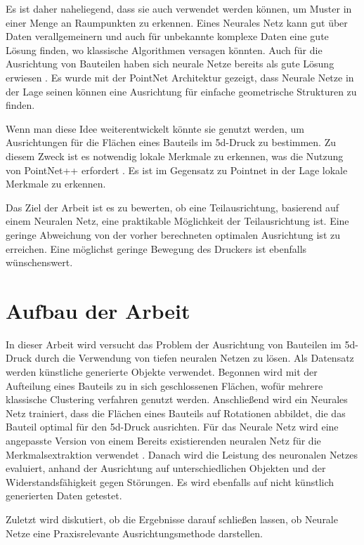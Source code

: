 \smallskip

Es ist daher naheliegend, dass sie auch verwendet werden können, um Muster in einer Menge an Raumpunkten zu erkennen. Eines Neurales Netz kann gut über Daten verallgemeinern und auch für unbekannte komplexe Daten eine gute Lösung finden, wo klassische Algorithmen versagen könnten.
Auch für die Ausrichtung von Bauteilen haben sich neurale Netze bereits als gute Lösung erwiesen \cite{Datensatz}. Es wurde mit der PointNet Architektur \cite{qi2017pointnet} gezeigt, 
dass Neurale Netze in der Lage seinen können eine Ausrichtung für einfache geometrische Strukturen zu finden. 

\smallskip

Wenn man diese Idee weiterentwickelt könnte sie genutzt werden, um Ausrichtungen für die Flächen eines Bauteils im 5d-Druck zu bestimmen.
Zu diesem Zweck ist es notwendig lokale Merkmale zu erkennen, was die Nutzung von PointNet++ erfordert \cite{PointNet++}. Es ist im Gegensatz zu Pointnet in der Lage lokale Merkmale zu erkennen.

\smallskip

Das Ziel der Arbeit ist es zu bewerten, ob eine Teilausrichtung, basierend auf einem Neuralen Netz, eine praktikable Möglichkeit der Teilausrichtung ist. 
Eine geringe Abweichung von der vorher berechneten optimalen Ausrichtung ist zu erreichen. Eine möglichst geringe Bewegung des Druckers ist ebenfalls wünschenswert.

\section{Aufbau der Arbeit}
\label{Aufbau_der_Arbeit}

In dieser Arbeit wird versucht das Problem der Ausrichtung von Bauteilen im 5d-Druck durch die Verwendung von tiefen neuralen Netzen zu lösen. Als Datensatz werden künstliche generierte Objekte verwendet.
Begonnen wird mit der Aufteilung eines Bauteils zu in sich geschlossenen Flächen, 
wofür mehrere klassische Clustering verfahren genutzt werden. Anschließend wird ein Neurales Netz trainiert, dass die Flächen eines Bauteils auf Rotationen abbildet, die das Bauteil optimal für den 5d-Druck ausrichten.
Für das Neurale Netz wird eine angepasste Version von einem Bereits existierenden neuralen Netz für die Merkmalsextraktion verwendet \cite{PointNet++}. Danach wird die Leistung des neuronalen Netzes evaluiert, 
anhand der Ausrichtung auf unterschiedlichen Objekten und der Widerstandsfähigkeit gegen Störungen. Es wird ebenfalls auf nicht künstlich generierten Daten getestet.

Zuletzt wird diskutiert, ob die Ergebnisse darauf schließen lassen, ob Neurale Netze eine Praxisrelevante Ausrichtungsmethode darstellen.

